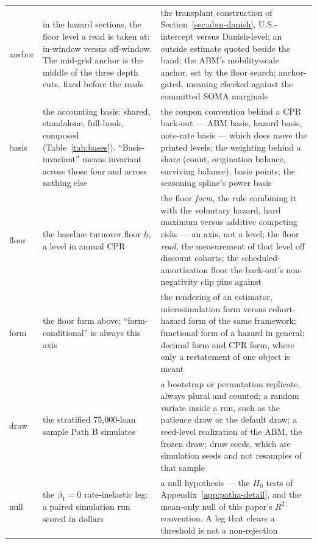\documentclass[12pt]{article}
\begin{document}
{\begin{longtable}{@{}p{1.5cm}p{6.2cm}p{6.2cm}@{}}
anchor & in the hazard sections, the floor level a read is taken at: in-window versus off-window. The mid-grid anchor is the middle of the three depth cuts, fixed before the reads & the transplant construction of Section~\ref{sec:abm-danish}, U.S.-intercept versus Danish-level; an outside estimate quoted beside the band; the ABM's mobility-scale anchor, set by the floor search; anchor-gated, meaning checked against the committed SOMA marginals \\
basis & the accounting basis: shared, standalone, full-book, composed (Table~\ref{tab:bases}). ``Basis-invariant'' means invariant across those four and across nothing else & the coupon convention behind a CPR back-out --- ABM basis, hazard basis, note-rate basis --- which does move the printed levels; the weighting behind a share (count, origination balance, surviving balance); basis points; the seasoning spline's power basis \\
floor & the baseline turnover floor $\underline{h}$, a level in annual CPR & the floor \emph{form}, the rule combining it with the voluntary hazard, hard maximum versus additive competing risks --- an axis, not a level; the floor \emph{read}, the measurement of that level off discount cohorts; the scheduled-amortization floor the back-out's non-negativity clip pins against \\
form & the floor form above; ``form-conditional'' is always this axis & the rendering of an estimator, microsimulation form versus cohort-hazard form of the same framework; functional form of a hazard in general; decimal form and CPR form, where only a restatement of one object is meant \\
draw & the stratified 75{,}000-loan sample Path B simulates & a bootstrap or permutation replicate, always plural and counted; a random variate inside a run, such as the patience draw or the default draw; a seed-level realization of the ABM, the frozen draw; draw seeds, which are simulation seeds and not resamples of that sample \\
null & the $\beta_1 = 0$ rate-inelastic leg: a paired simulation run scored in dollars & a null hypothesis --- the $H_0$ tests of Appendix~\ref{app:patha-detail}, and the mean-only null of this paper's $R^2$ convention. A leg that clears a threshold is not a non-rejection \\
\bottomrule
\end{longtable}
}

\end{document}
